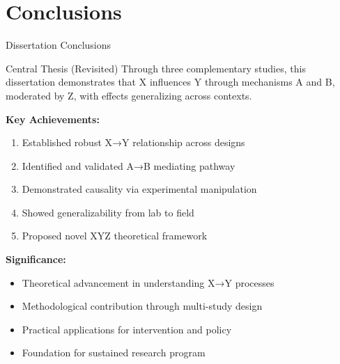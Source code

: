 \documentclass[aspectratio=169,12pt]{beamer}
\begin{document}

\section{Conclusions}

\begin{frame}{Dissertation Conclusions}
  \begin{exampleblock}{Central Thesis (Revisited)}
    Through three complementary studies, this dissertation demonstrates that X influences Y through mechanisms A and B, moderated by Z, with effects generalizing across contexts.
  \end{exampleblock}

  \vspace{0.5cm}

  \textbf{Key Achievements:}
  \begin{enumerate}
    \item Established robust X→Y relationship across designs
    \item Identified and validated A→B mediating pathway
    \item Demonstrated causality via experimental manipulation
    \item Showed generalizability from lab to field
    \item Proposed novel XYZ theoretical framework
  \end{enumerate}

  \vspace{0.5cm}

  \textbf{Significance:}
  \begin{itemize}
    \item Theoretical advancement in understanding X→Y processes
    \item Methodological contribution through multi-study design
    \item Practical applications for intervention and policy
    \item Foundation for sustained research program
  \end{itemize}
\end{frame}
\end{document}
